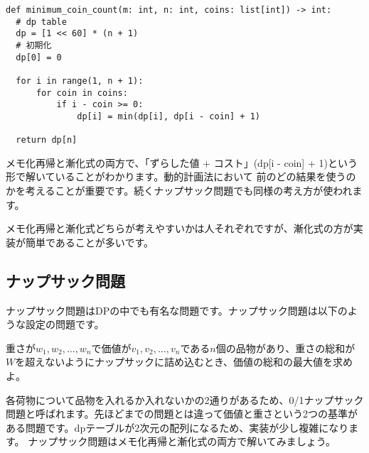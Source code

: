 \begin{lstlisting}[caption=漸化式を用いたコイン問題の実装, frame=TRBL, label={dp_coin}]
def minimum_coin_count(m: int, n: int, coins: list[int]) -> int:
  # dp table
  dp = [1 << 60] * (n + 1)
  # 初期化
  dp[0] = 0
  
  for i in range(1, n + 1):
      for coin in coins:
          if i - coin >= 0:
              dp[i] = min(dp[i], dp[i - coin] + 1)
  
  return dp[n]
\end{lstlisting}

メモ化再帰と漸化式の両方で、「ずらした値 + コスト」(dp[i - coin] + 1)という形で解いていることがわかります。動的計画法において
前のどの結果を使うのかを考えることが重要です。続くナップサック問題でも同様の考え方が使われます。

メモ化再帰と漸化式どちらが考えやすいかは人それぞれですが、漸化式の方が実装が簡単であることが多いです。

\subsection{ナップサック問題}
ナップサック問題はDPの中でも有名な問題です。ナップサック問題は以下のような設定の問題です。

\begin{problem}
  重さが$w_1, w_2, \ldots, w_n$で価値が$v_1, v_2, \ldots, v_n$である$n$個の品物があり、重さの総和が$W$を超えないようにナップサックに詰め込むとき、価値の総和の最大値を求めよ。
\end{problem}

各荷物について品物を入れるか入れないかの2通りがあるため、0/1ナップサック問題と呼ばれます。先ほどまでの問題とは違って価値と重さという2つの基準がある問題です。dpテーブルが2次元の配列になるため、実装が少し複雑になります。
ナップサック問題はメモ化再帰と漸化式の両方で解いてみましょう。

